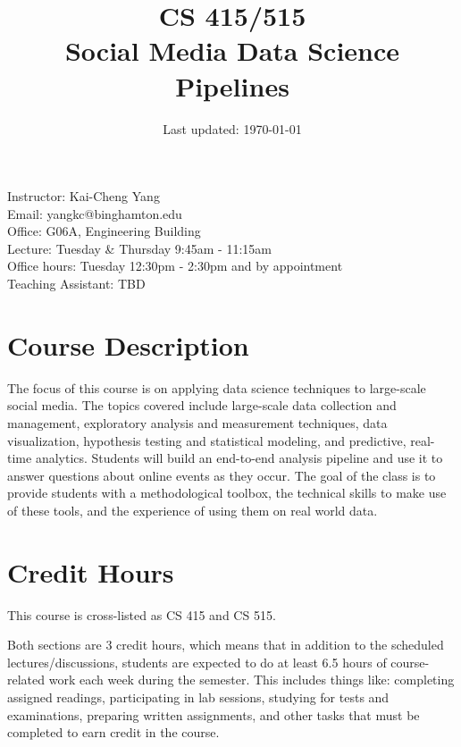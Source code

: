 \documentclass[11pt,article,oneside]{memoir} %
\makeatletter
\def\myauthor{Author}
\def\mytitle{Title}
\def\myemail{yangkc@binghamton.edu}
\def\myauthor{Kai-Cheng Yang}
\def\mytitle{{\normalsize CS 415/515} \\ \HUGE{} Social Media Data Science Pipelines}
\makeatother
\begin{document}

\title{\LARGE \mytitle} %
\date{Last updated: \today}


\maketitle

Instructor: \myauthor \\
Email: \myemail\\
Office: G06A, Engineering Building \\
Lecture: Tuesday \& Thursday 9:45am - 11:15am \\
Office hours: Tuesday 12:30pm - 2:30pm and by appointment \\

Teaching Assistant: TBD \\

\section{Course Description}%

The focus of this course is on applying data science techniques to large-scale social media.
The topics covered include large-scale data collection and management, exploratory analysis and measurement techniques, data visualization, hypothesis testing and statistical modeling, and predictive, real-time analytics.
Students will build an end-to-end analysis pipeline and use it to answer questions about online events as they occur.
The goal of the class is to provide students with a methodological toolbox, the technical skills to make use of these tools, and the experience of using them on real world data.


\section{Credit Hours}

This course is cross-listed as CS 415 and CS 515.

Both sections are 3 credit hours, which means that in addition to the scheduled lectures/discussions, students are expected to do at least 6.5 hours of course-related work each week during the semester.
This includes things like: completing assigned readings, participating in lab sessions, studying for tests and examinations, preparing written assignments, and other tasks that must be completed to earn credit in the course.
\end{document}
